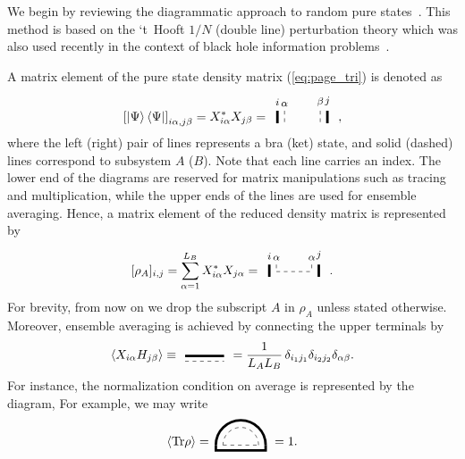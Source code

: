 \documentclass[aps,pra,groupedaddress,onecolumn,notitlepage,superscriptaddress,10pt]{revtex4-1}
\newcommand{\Tr}{\text{Tr}}
\begin{document}
We begin by reviewing the diagrammatic approach to random pure states~\cite{Jurkiewicz,Zee1995}. This method is based on the `t~Hooft $1/N$ (double line) perturbation theory which was also used recently in the context of black hole information problems~\cite{Shenker2019}.

A matrix element of the pure state density matrix (\ref{eq:page_tri}) is denoted as
\begin{align}
    \left[\ket{\Psi}\bra{\Psi}\right]_{i\alpha,j\beta}= X_{i\alpha}^\ast X_{j\beta}
    =%
    \,
    \tikz[baseline=-0.5ex]{
    \draw[dashed] (0,0.2) node[align=center, above] {\footnotesize $\alpha$} -- (0,-0.2);
    \draw[dashed] (1,0.2) node[align=center, above] {\footnotesize $\beta$} -- (1,-0.2);
    \draw[line width=2] (-0.2,0.2) node[align=center, above] {\footnotesize $i$} -- (-0.2,-0.15);
    \draw[line width=2] (1.2,0.2) node[align=center, above] {\footnotesize $j$} -- (1.2,-0.15);
    }\ ,
\end{align}
where the left (right) pair of lines represents a bra (ket) state, and solid (dashed) lines correspond to subsystem $A$ ($B$). Note that each line carries an index. The lower end of the diagrams are reserved for matrix manipulations such as tracing and multiplication, while the upper ends of the lines are used for ensemble averaging.
Hence, a matrix element of the reduced density matrix is represented by
\begin{align}
    \label{eq:rho_diag}
    [\rho_A]_{i,j}= 
    {\sum_{\alpha=1}^{L_B} X_{i\alpha}^\ast X_{j\alpha}}
= %
\,
    \tikz[baseline=-0.5ex]{
    \draw[dashed] (0,0.2) node[align=center, above] {\footnotesize $\alpha$} -- (0,0);
    \draw[dashed] (0,0)  -- (1,0);
    \draw[dashed]  (1,0.2) node[align=center, above] {\footnotesize $\alpha$} -- (1,0);
    \draw[line width=2] (-0.2,0.2) node[align=center, above] {\footnotesize $i$} -- (-0.2,-0.15);
    \draw[line width=2] (1.2,0.2) node[align=center, above] {\footnotesize $j$} -- (1.2,-0.15);
    }\ .
\end{align}
For brevity, from now on we drop the subscript $A$ in $\rho_A$ unless stated otherwise.
Moreover, ensemble averaging is achieved by connecting the upper terminals by
\begin{align}
\braket{X_{i \alpha} H_{j \beta}} \equiv
\
\tikz[baseline=-0.8ex,scale=1]{
    \draw[line width=2] (0,-0.05)--(1.1,-0.05);
    \draw[dashed] (0,-0.2)--(1.1,-0.2);
    }
    \ 
    =\frac{1}{L_{A} L_B}\, \delta_{i_1 j_1} \delta_{i_2 j_2} \delta_{\alpha\beta}.
\end{align} 
For instance, the normalization condition on average is represented by the diagram,
For example, we may write
\begin{align}
    \braket{\Tr\rho}=
    \,
    \tikz[baseline=0ex]{
    \draw[dashed] (1.0,0) arc (0:180:0.5);
    \draw[dashed] (0,0) -- (1,0);
    \draw[line width=2] (1.2,0.) arc (0:180:0.7);
    \draw[line width=2] (-0.2,0.0)-- (-0.2,-0.15)--(1.2,-0.15)-- (1.2,0.0);
    }\ = 1.
\end{align}
\end{document}
